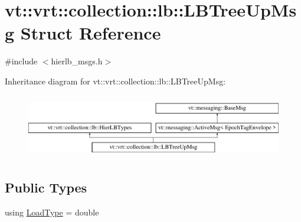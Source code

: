 \hypertarget{structvt_1_1vrt_1_1collection_1_1lb_1_1_l_b_tree_up_msg}{}\section{vt\+:\+:vrt\+:\+:collection\+:\+:lb\+:\+:L\+B\+Tree\+Up\+Msg Struct Reference}
\label{structvt_1_1vrt_1_1collection_1_1lb_1_1_l_b_tree_up_msg}


{\ttfamily \#include $<$hierlb\+\_\+msgs.\+h$>$}

Inheritance diagram for vt\+:\+:vrt\+:\+:collection\+:\+:lb\+:\+:L\+B\+Tree\+Up\+Msg\+:\begin{figure}[H]
\begin{center}
\leavevmode
\includegraphics[height=2.847458cm]{structvt_1_1vrt_1_1collection_1_1lb_1_1_l_b_tree_up_msg}
\end{center}
\end{figure}
\subsection*{Public Types}
\begin{DoxyCompactItemize}
\item 
using \hyperlink{structvt_1_1vrt_1_1collection_1_1lb_1_1_l_b_tree_up_msg_a94e88fdd5142e26330a7feb8769de1bb}{Load\+Type} = double
\end{DoxyCompactItemize}
